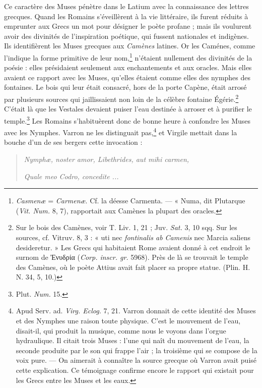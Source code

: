 \documentclass[landscape, a4paper, 11pt, oneside, polutonikogreek, french]{article}
\begin{document}
Ce caractère des Muses pénètre dans le Latium avec la connaissance des lettres grecques. Quand les Romains s'éveillèrent à la vie littéraire, ils furent réduits à emprunter aux Grecs un mot pour désigner le poète profane ; mais ils voulurent avoir des divinités de l'inspiration poétique, qui fussent nationales et indigènes. Ils identifièrent les Muses grecques aux \emph{Camènes} latines. Or les Caménes, comme l'indique la forme primitive de leur nom,\footnote{\emph{Casmenæ} = \emph{Carmenæ}. Cf. la déesse Carmenta. --- « Numa, dit Plutarque (\emph{Vit. Num.} 8, 7), rapportait aux Camènes la plupart des oracles.} n'étaient nullement des divinités de la poésie : elles présidaient seulement aux enchantements et aux oracles. Mais elles avaient ce rapport avec les Muses, qu'elles étaient comme elles des nymphes des fontaines. Le bois qui leur était consacré, hors de la porte Capène, était arrosé par plusieurs sources qui jaillissaient non loin de la célèbre fontaine Égérie.\footnote{Sur le bois des Camènes, voir T. Liv. 1, 21 ; Juv. \emph{Sat.} 3, 10 sqq. Sur les sources, cf. Vitruv. 8, 3 : « uti nec \emph{fontinalis ab Camenis} nec Marcia saliens desideretur. » Les Grecs qui habitaient Rome avaient donné à cet endroit le surnom de Ἐνυδρία (\emph{Corp. inscr. gr.} 5968). Près de là se trouvait le temple des Camènes, où le poète Attius avait fait placer sa propre statue. (Plin. H. N. 34, 5, 10.)} C'était là que les Vestales devaient puiser l'eau destinée à arroser et à purifier le temple.\footnote{Plut. \emph{Num.} 15.} Les Romains s'habituèrent donc de bonne heure à confondre les Muses avec les Nymphes. Varron ne les distinguait pas,\footnote{Apud Serv. ad. \emph{Virg. Eclog.} 7, 21. Varron donnait de cette identité des Muses et des Nymphes une raison toute physique. C'est le mouvement de l'eau, disait-il, qui produit la musique, comme nous le voyons dans l'orgue hydraulique. Il citait trois Muses : l'une qui naît du mouvement de l'eau, la seconde produite par le son qui frappe l'air ; la troisième qui se compose de la voix pure. --- On aimerait à connaître la source grecque où Varron avait puisé cette explication. Ce témoignage confirme encore le rapport qui existait pour les Grecs entre les Muses et les eaux.} et Virgile mettait dans la bouche d'un de ses bergers cette invocation :
\begin{quotation}
\emph{Nymphæ, noster amor, Libethrides, aut mihi carmen,}

\emph{Quale meo Codro, concedite ...}
\end{quotation}
\end{document}
